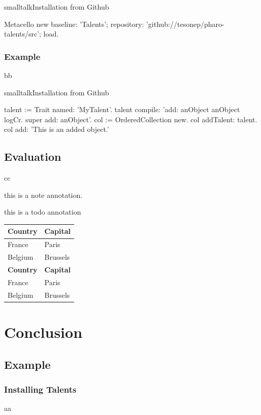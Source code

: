 \documentclass[10pt,twoside,english]{_support/latex/sbabook/sbabook}
\begin{document}
\begin{listing}[float, label=install]{smalltalk}{Installation from Github}

Metacello new
  baseline: 'Talents';
  repository: 'github://tesonep/pharo-talents/src';
  load.
\end{listing}
\subsection{Example}
bb

\begin{listing}[float, label=talent-example]{smalltalk}{Installation from Github}

talent := Trait named: 'MyTalent'.
talent compile: 'add: anObject
anObject logCr.
super add: anObject'.
col := OrderedCollection new.
col addTalent: talent.
col add: 'This is an added object.'
\end{listing}
\section{Evaluation}
cc

\begin{note}
this is a note annotation.
\end{note}

\begin{todo}
this is a todo annotation
\end{todo}

\begin{tabular}{ll}
\toprule
\textbf{Country} & \textbf{Capital} \\
\midrule
France & Paris \\
Belgium & Brussels \\
\textbf{Country} & \textbf{Capital} \\
\midrule
France & Paris \\
Belgium & Brussels \\
\bottomrule
\end{tabular}
\chapter{Conclusion}\section{Example}\subsection{Installing Talents}
aa
\end{document}
